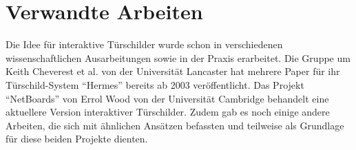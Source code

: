 \chapter{Verwandte Arbeiten}
Die Idee für interaktive Türschilder wurde schon in verschiedenen wissenschaftlichen Ausarbeitungen sowie in der Praxis erarbeitet.
Die Gruppe um Keith Cheverest et al. von der Universität Lancaster hat mehrere Paper für ihr Türschild-System ``Hermes'' \cite{cheverest:2003:paper} bereits ab 2003 veröffentlicht.
Das Projekt ``NetBoards'' von Errol Wood \cite{wood:2014} von der Universität Cambridge behandelt eine aktuellere Version interaktiver Türschilder.
Zudem gab es noch einige andere Arbeiten, die sich mit ähnlichen Ansätzen befassten und teilweise als Grundlage für diese beiden Projekte dienten.


